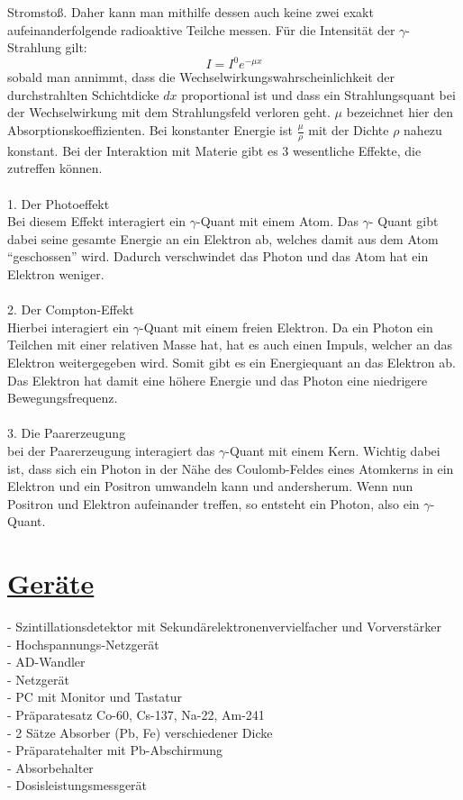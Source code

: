 \documentclass[11pt,a4paper]{article}
\begin{document}
  Stromsto{\ss}. Daher kann man mithilfe dessen auch keine zwei exakt aufeinanderfolgende radioaktive Teilche messen.
  F\"ur die Intensit\"at der $\gamma$-Strahlung gilt:
   \begin{equation}
    I = {I}^{0}{e}^{- \mu x}
   \end{equation}
  sobald man annimmt, dass die Wechselwirkungswahrscheinlichkeit der durchstrahlten
  Schichtdicke $dx$ proportional ist und dass ein Strahlungsquant bei der Wechselwirkung mit dem Strahlungsfeld verloren geht. $\mu$ bezeichnet hier den Absorptionskoeffizienten. 
  Bei konstanter Energie ist $\frac{\mu}{\rho}$ mit der Dichte $\rho$ nahezu konstant. 
  Bei der Interaktion mit Materie gibt es 3 wesentliche Effekte, die zutreffen können.
  \\\\
  1. Der Photoeffekt \\
  Bei diesem Effekt interagiert ein $\gamma$-Quant mit einem Atom. Das $\gamma$-
  Quant gibt dabei seine gesamte Energie an ein Elektron ab, welches damit aus dem Atom
  ``geschossen'' wird. Dadurch verschwindet das Photon und das Atom hat ein Elektron
  weniger.
  \\\\
  2. Der Compton-Effekt \\
  Hierbei interagiert ein $\gamma$-Quant mit einem freien Elektron. Da ein Photon ein
  Teilchen mit einer relativen Masse hat, hat es auch einen Impuls, welcher an das
  Elektron weitergegeben wird. Somit gibt es ein Energiequant an das Elektron ab. Das
  Elektron hat damit eine höhere Energie und das Photon eine niedrigere
  Bewegungsfrequenz.
  \\\\
  3. Die Paarerzeugung \\
  bei der Paarerzeugung interagiert das $\gamma$-Quant mit einem Kern. Wichtig dabei
  ist, dass sich ein Photon in der Nähe des Coulomb-Feldes eines Atomkerns in ein
  Elektron und ein Positron umwandeln kann und andersherum. Wenn nun Positron und
  Elektron aufeinander treffen, so entsteht ein Photon, also ein $\gamma$-Quant.
 \newpage
 \section{\underline{Geräte}}
    - Szintillationsdetektor mit Sekundärelektronenvervielfacher und Vorverstärker
  \\- Hochspannungs-Netzgerät
  \\- AD-Wandler
  \\- Netzgerät
  \\- PC mit Monitor und Tastatur
  \\- Präparatesatz Co-60, Cs-137, Na-22, Am-241
  \\- 2 Sätze Absorber (Pb, Fe) verschiedener Dicke
  \\- Präparatehalter mit Pb-Abschirmung
  \\- Absorbehalter
  \\- Dosisleistungsmessgerät
\end{document}
